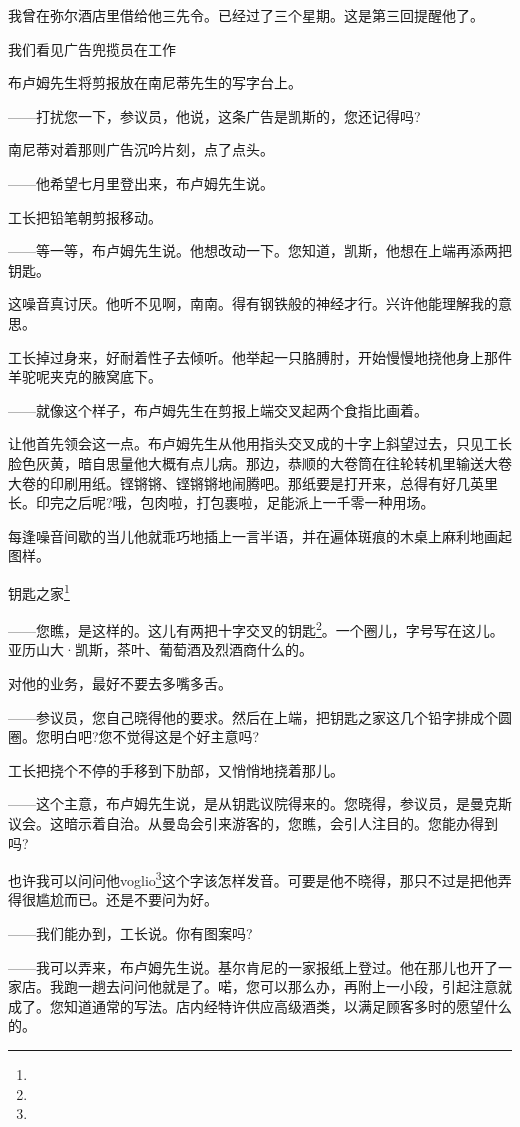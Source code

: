 \par 我曾在弥尔酒店里借给他三先令。已经过了三个星期。这是第三回提醒他了。
\par 我们看见广告兜揽员在工作
\par 布卢姆先生将剪报放在南尼蒂先生的写字台上。
\par ——打扰您一下，参议员，他说，这条广告是凯斯的，您还记得吗?
\par 南尼蒂对着那则广告沉吟片刻，点了点头。
\par ——他希望七月里登出来，布卢姆先生说。
\par 工长把铅笔朝剪报移动。
\par ——等一等，布卢姆先生说。他想改动一下。您知道，凯斯，他想在上端再添两把钥匙。
\par 这噪音真讨厌。他听不见啊，南南。得有钢铁般的神经才行。兴许他能理解我的意思。
\par 工长掉过身来，好耐着性子去倾听。他举起一只胳膊肘，开始慢慢地挠他身上那件羊驼呢夹克的腋窝底下。
\par ——就像这个样子，布卢姆先生在剪报上端交叉起两个食指比画着。
\par 让他首先领会这一点。布卢姆先生从他用指头交叉成的十字上斜望过去，只见工长脸色灰黄，暗自思量他大概有点儿病。那边，恭顺的大卷筒在往轮转机里输送大卷大卷的印刷用纸。铿锵锵、铿锵锵地闹腾吧。那纸要是打开来，总得有好几英里长。印完之后呢?哦，包肉啦，打包裹啦，足能派上一千零一种用场。
\par 每逢噪音间歇的当儿他就乖巧地插上一言半语，并在遍体斑痕的木桌上麻利地画起图样。
\par 钥匙之家\footnote{}
\par ——您瞧，是这样的。这儿有两把十字交叉的钥匙\footnote{}。一个圈儿，字号写在这儿。亚历山大·凯斯，茶叶、葡萄酒及烈酒商什么的。
\par 对他的业务，最好不要去多嘴多舌。
\par ——参议员，您自己晓得他的要求。然后在上端，把钥匙之家这几个铅字排成个圆圈。您明白吧?您不觉得这是个好主意吗?
\par 工长把挠个不停的手移到下肋部，又悄悄地挠着那儿。
\par ——这个主意，布卢姆先生说，是从钥匙议院得来的。您晓得，参议员，是曼克斯议会。这暗示着自治。从曼岛会引来游客的，您瞧，会引人注目的。您能办得到吗?
\par 也许我可以问问他voglio\footnote{}这个字该怎样发音。可要是他不晓得，那只不过是把他弄得很尴尬而已。还是不要问为好。
\par ——我们能办到，工长说。你有图案吗?
\par ——我可以弄来，布卢姆先生说。基尔肯尼的一家报纸上登过。他在那儿也开了一家店。我跑一趟去问问他就是了。喏，您可以那么办，再附上一小段，引起注意就成了。您知道通常的写法。店内经特许供应高级酒类，以满足顾客多时的愿望什么的。
